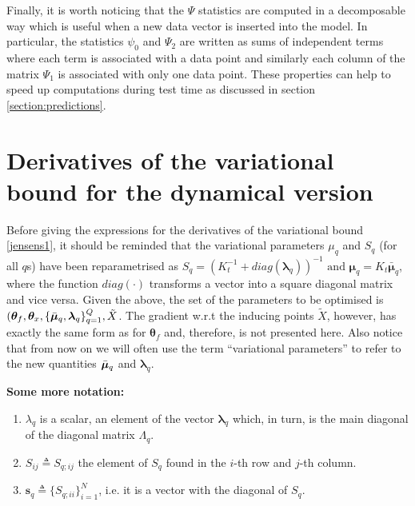 Finally, it is worth noticing that the $\Psi$ statistics are computed in 
a decomposable way which is useful when a new data vector %
is inserted into the model. In particular, the statistics 
$\psi_0$ and $\Psi_2$ are written as sums of independent terms
where each term is associated with a data point and similarly 
each column of the matrix $\Psi_1$ is associated with only one data point.
These properties can help to speed up computations during
test time as discussed in section \ref{section:predictions}.  



\section{Derivatives of the variational bound for the dynamical version}
Before giving the expressions for the derivatives of the variational bound \eqref{jensens1},
it should be reminded that the variational parameters $\mu_q$ and $S_q$ (for all $q$s) have been
reparametrised as $S_q = \left( \mathit{K}_t^{-1} + diag(\boldsymbol \lambda_q) \right)^{-1}  \text{ and }   \boldsymbol \mu_q = K_t \bar{\boldsymbol \mu}_q$, where the function $diag(\cdot)$ transforms a vector into a square diagonal matrix and vice versa. Given the above, the set of the parameters to be optimised is 
$( \boldsymbol \theta_f, \boldsymbol \theta_x, \{ \bar{\boldsymbol \mu}_q, \boldsymbol \lambda_q \}_{q=1}^Q, \tilde{X}$. The gradient w.r.t the inducing points $\tilde{X}$, however, has exactly the same form as for $\boldsymbol \theta_f$ and, therefore, is not presented here. Also notice that from now on we will often use the term ``variational parameters'' to refer to the new quantities $\bar{\boldsymbol \mu}_q$ and $\boldsymbol \lambda_q$. 

\textbf{Some more notation:} 
\begin{enumerate}
\item $\lambda_q$ is a scalar, an element of the vector $\boldsymbol \lambda_q$ which, in turn, is the main diagonal of the diagonal matrix $\Lambda_q$. 
\item $S_{ij} \triangleq S_{q;ij}$ the element of $S_q$ found in the $i$-th row and $j$-th column.
\item $\mathbf{s}_q \triangleq \lbrace S_{q;ii} \rbrace_{i=1}^N$, i.e. it is a vector with the diagonal of $S_q$.
\end{enumerate}

